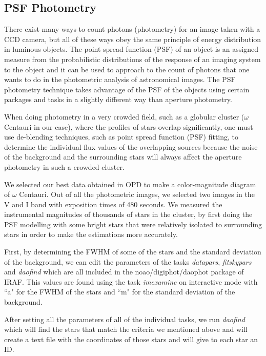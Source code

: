 \subsection{PSF Photometry}

There exist many ways to count photons (photometry) for an image taken with a CCD camera, but all of these ways obey the same principle of energy distribution in luminous objects. The point spread function (PSF) of an object is an assigned measure from the probabilistic distributions of the response of an imaging system to the object and it can be used to approach to the count of photons that one wants to do in the photometric analysis of astronomical images. The PSF photometry technique takes advantage of the PSF of the objects using certain packages and tasks in a slightly different way than aperture photometry.

When doing photometry in a very crowded field, such as a globular cluster ($\omega$ Centauri in our case), where the profiles of stars overlap significantly, one must use de-blending techniques, such as point spread function (PSF) fitting, to determine the individual flux values of the overlapping sources because the noise of the background and the surrounding stars will always affect the aperture photometry in such a crowded cluster. 

We selected our best data obtained in OPD to make a color-magnitude diagram of $\omega$ Centauri. Out of all the photometric images, we selected two images in the V and I band with exposition times of 480 seconds. We measured the instrumental magnitudes of thousands of stars in the cluster, by first doing the PSF modelling with some bright stars that were relatively isolated to surrounding stars in order to make the estimations more accurately.

First, by determining the FWHM of some of the stars and the standard deviation of the background, we can edit the parameters of the tasks \textit{datapars}, \textit{fitskypars} and \textit{daofind} which are all included in the noao/digiphot/daophot package of IRAF. This values are found using the task \textit{imexamine} on interactive mode with ``a" for the FWHM of the stars and ``m" for the standard deviation of the background. 

After setting all the parameters of all of the individual tasks, we run \textit{daofind} which will find the stars that match the criteria we mentioned above and will create a text file with the coordinates of those stars and will give to each star an ID.

